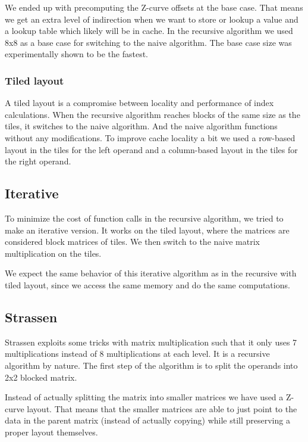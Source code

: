 We ended up with precomputing the Z-curve offsets at the base case. That means we get an extra level of indirection when we want to store or lookup a value and a lookup table which likely will be in cache. In the recursive algorithm we used 8x8 as a base case for switching to the naive algorithm. The base case size was experimentally shown to be the fastest.

\subsubsection{Tiled layout}

A tiled layout is a compromise between locality and performance of index calculations. When the recursive algorithm reaches blocks of the same size as the tiles, it switches to the naive algorithm. And the naive algorithm functions without any modifications. To improve cache locality a bit we used a row-based layout in the tiles for the left operand and a column-based layout in the tiles for the right operand.

\subsection{Iterative}
To minimize the cost of function calls in the recursive algorithm, we tried to make an iterative version. It works on the tiled
layout, where the matrices are considered block matrices of
tiles. We then switch to the naive matrix multiplication on the tiles.

We expect the same behavior of this iterative algorithm as in the
recursive with tiled layout, since we access the same memory and do
the same computations.

\subsection{Strassen}

Strassen exploits some tricks with matrix multiplication such that it only uses 7 multiplications instead of 8 multiplications at each level. It is a recursive algorithm by nature. The first step of the algorithm is to split the operands into 2x2 blocked matrix.

Instead of actually splitting the matrix into smaller matrices we have used a Z-curve layout. That means that the smaller matrices are able to just point to the data in the parent matrix (instead of actually copying) while still preserving a proper layout themselves.

